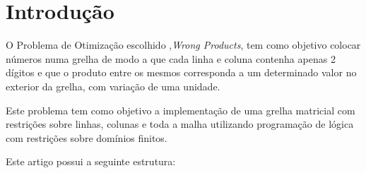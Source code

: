 \documentclass[11pt]{article}
\begin{document}
\section{Introdução}

O Problema de Otimização escolhido ,\emph{Wrong Products}, tem como objetivo colocar números numa grelha de modo a que cada linha e coluna contenha apenas 2 dígitos e que o produto entre os mesmos corresponda a um determinado valor no exterior da grelha, com variação de uma unidade.

Este problema tem como objetivo a implementação de uma grelha matricial com restrições sobre linhas, colunas e toda a malha utilizando programação de lógica com restrições sobre domínios finitos.

\bigskip

Este artigo possui a seguinte estrutura:
\end{document}
